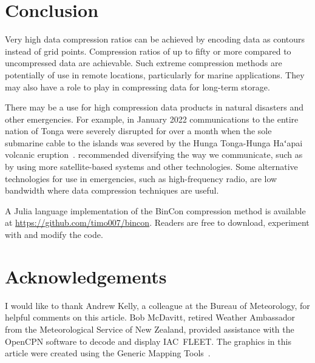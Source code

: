 \documentclass[12pt,a4paper]{article}
\newcommand{\f}{{\fontspec{LibertinusSerif}ʻ}}
\begin{document}
\section*{Conclusion}
\label{sec:conclusion}

Very high data compression ratios can be achieved by encoding data as contours
instead of grid points. Compression ratios of up to fifty or more compared to
uncompressed data are achievable. Such extreme compression methods are
potentially of use in remote locations, particularly for marine applications.
They may also have a role to play in compressing data for long-term storage.

There may be a use for high compression data products in natural disasters and
other emergencies. For example, in January 2022 communications to the
entire nation of Tonga were severely disrupted for over a month when the sole
submarine cable to the islands was severed by the Hunga Tonga-Hunga Ha\f apai
volcanic eruption~\citep{dominey-howes2022}. \citeauthor{dominey-howes2022}
recommended diversifying the way we communicate, such as by using more
satellite-based systems and other technologies. Some alternative
technologies for use in emergencies, such as high-frequency radio, are low
bandwidth where data compression techniques are useful.

A Julia language implementation of the BinCon compression method is available
at \url{https://github.com/timo007/bincon}. Readers are free to download,
experiment with and modify the code.

\section*{Acknowledgements}
\label{sec:acknowledgements}

I would like to thank Andrew Kelly, a colleague at the Bureau of Meteorology,
for helpful comments on this article. Bob McDavitt, retired Weather Ambassador
from the Meteorological Service of New Zealand, provided assistance with the
OpenCPN software to decode and display IAC~FLEET. The graphics in this article
were created using the Generic Mapping Tools~\citep{wessel_etal2019}.
\end{document}
